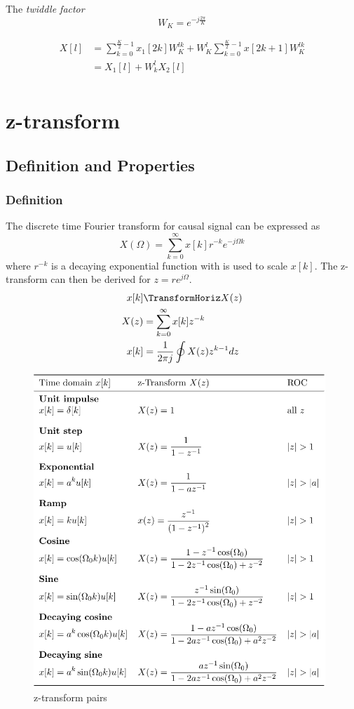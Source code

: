 \documentclass{article}
\begin{document}
The \textit{twiddle factor}
\begin{equation*}
    W_K = e^{-j\frac{2\pi}{K}}
\end{equation*}

\begin{align*}
    X[l] &= \sum_{k=0}^{\frac{K}{2}-1}x_1[2k]W_K^{lk} + W_K^{l} \sum_{k=0}^{\frac{K}{2}-1}x[2k+1]W_K^{lk}  \\
    &= X_1[l] + W_k^l X_2[l] \\
\end{align*}


\newpage
\section{z-transform}
\subsection{Definition and Properties}
\subsubsection{Definition}
The discrete time Fourier transform for causal signal can be expressed as
\begin{equation*}
    X(\Omega) = \sum_{k=0}^{\infty}x[k]r^{-k}e^{-j\Omega k}
\end{equation*}
where $r^{-k}$ is a decaying exponential function with is used to scale $x[k]$.
The z-transform can then be derived for $z=re^{j\Omega}$.
\begin{align*}
    x[k] &\TransformHoriz X(z) \\
    X(z) &= \sum_{k=0}^{\infty} x[k]z^{-k} \\
    x[k] &= \frac{1}{2\pi j} \oint X(z)z^{k-1}dz \\
\end{align*}

\begin{figure}[!h]
    \centering
    \includegraphics[width=11cm]{image/z-transform_pairs.png}
    \caption{z-transform pairs}
    \label{fig:z-transform_pairs}
\end{figure}
\end{document}
